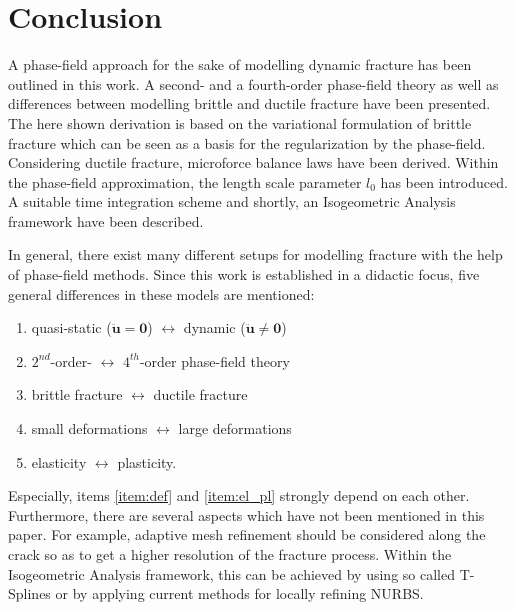\section{Conclusion} \label{sec:concl}
A phase-field approach for the sake of modelling dynamic fracture has been outlined in this work. A second- and a fourth-order phase-field theory as well as differences between modelling brittle and ductile fracture have been presented. The here shown derivation is based on the variational formulation of brittle fracture which can be seen as a basis for the regularization by the phase-field. Considering ductile fracture, microforce balance laws have been derived. Within the phase-field approximation, the length scale parameter $l_{0}$ has been introduced. A suitable time integration scheme and shortly, an Isogeometric Analysis framework have been described.

In general, there exist many different setups for modelling fracture with the help of phase-field methods. Since this work is established in a didactic focus, five general differences in these models are mentioned:
\begin{enumerate}
	\item quasi-static ($\ddot{\mathbf{u}}=\mathbf{0}$) $\leftrightarrow$  dynamic ($\ddot{\mathbf{u}}\neq\mathbf{0}$)
	\item $2^{nd}$-order- $\leftrightarrow$ $4^{th}$-order phase-field theory
	\item brittle fracture $\leftrightarrow$ ductile fracture
	\item\label{item:def} small deformations $\leftrightarrow$ large deformations
	\item\label{item:el_pl} elasticity $\leftrightarrow$ plasticity.
\end{enumerate}
Especially, items \ref{item:def} and \ref{item:el_pl} strongly depend on each other. Furthermore, there are several aspects which have not been mentioned in this paper. For example, adaptive mesh refinement should be considered along the crack so as to get a higher resolution of the fracture process. Within the Isogeometric Analysis framework, this can be achieved by using so called T-Splines or by applying current methods for locally refining NURBS.

